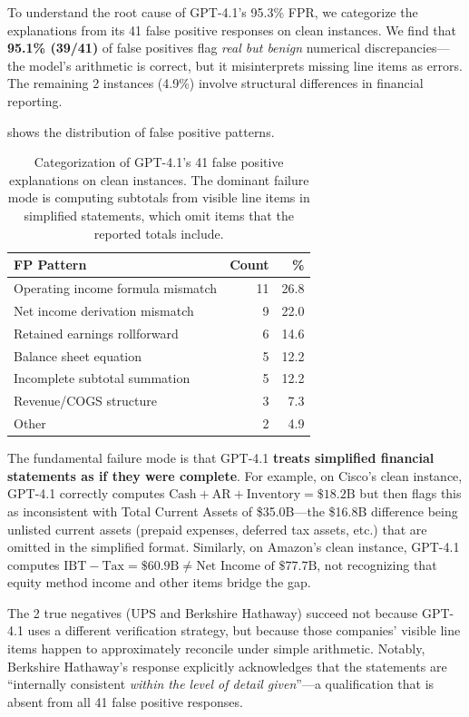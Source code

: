 \documentclass[11pt]{article}
\begin{document}
To understand the root cause of GPT-4.1's 95.3\% FPR, we categorize the explanations from its 41 false positive responses on clean instances.
We find that \textbf{95.1\% (39/41)} of false positives flag \emph{real but benign} numerical discrepancies---the model's arithmetic is correct, but it misinterprets missing line items as errors.
The remaining 2 instances (4.9\%) involve structural differences in financial reporting.

 shows the distribution of false positive patterns.

\begin{table}[t]
\centering
\small
\caption{Categorization of GPT-4.1's 41 false positive explanations on clean instances.
The dominant failure mode is computing subtotals from visible line items in simplified statements, which omit items that the reported totals include.}
\label{tab:fp_patterns}
\begin{tabular}{lrr}
\toprule
\textbf{FP Pattern} & \textbf{Count} & \textbf{\%} \\
\midrule
Operating income formula mismatch & 11 & 26.8 \\
Net income derivation mismatch & 9 & 22.0 \\
Retained earnings rollforward & 6 & 14.6 \\
Balance sheet equation & 5 & 12.2 \\
Incomplete subtotal summation & 5 & 12.2 \\
Revenue/COGS structure & 3 & 7.3 \\
Other & 2 & 4.9 \\
\bottomrule
\end{tabular}
\end{table}

The fundamental failure mode is that GPT-4.1 \textbf{treats simplified financial statements as if they were complete}.
For example, on Cisco's clean instance, GPT-4.1 correctly computes $\text{Cash} + \text{AR} + \text{Inventory} = \$18.2\text{B}$ but then flags this as inconsistent with Total Current Assets of \$35.0B---the \$16.8B difference being unlisted current assets (prepaid expenses, deferred tax assets, etc.) that are omitted in the simplified format.
Similarly, on Amazon's clean instance, GPT-4.1 computes $\text{IBT} - \text{Tax} = \$60.9\text{B} \neq \text{Net Income of } \$77.7\text{B}$, not recognizing that equity method income and other items bridge the gap.

The 2 true negatives (UPS and Berkshire Hathaway) succeed not because GPT-4.1 uses a different verification strategy, but because those companies' visible line items happen to approximately reconcile under simple arithmetic.
Notably, Berkshire Hathaway's response explicitly acknowledges that the statements are ``internally consistent \emph{within the level of detail given}''---a qualification that is absent from all 41 false positive responses.
\end{document}
